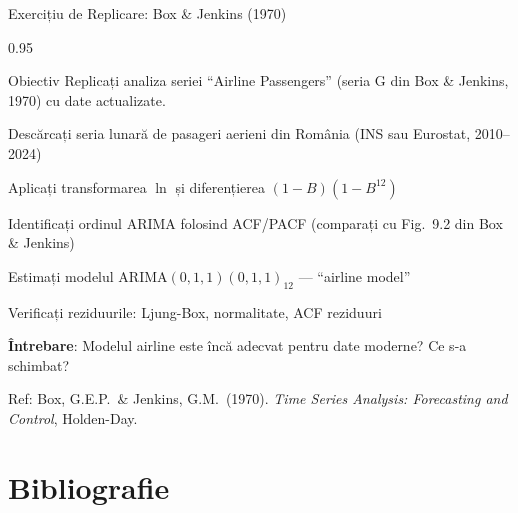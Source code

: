 \documentclass[9pt, aspectratio=169, t]{beamer}
\begin{document}
\begin{frame}{Exercițiu de Replicare: Box \& Jenkins (1970)}
    \begin{cminipage}{0.95\textwidth}
        \begin{block}{Obiectiv}
            Replicați analiza seriei ``Airline Passengers'' (seria G din Box \& Jenkins, 1970) cu date actualizate.
        \end{block}
        \begin{enumerate}\setlength{\itemsep}{2pt}
            {\small
            \item Descărcați seria lunară de pasageri aerieni din România (INS sau Eurostat, 2010--2024)
            \item Aplicați transformarea $\ln$ și diferențierea $(1-B)(1-B^{12})$
            \item Identificați ordinul ARIMA folosind ACF/PACF (comparați cu Fig.\ 9.2 din Box \& Jenkins)
            \item Estimați modelul ARIMA$(0,1,1)(0,1,1)_{12}$ --- ``airline model''
            \item Verificați reziduurile: Ljung-Box, normalitate, ACF reziduuri
            \item \textbf{Întrebare}: Modelul airline este încă adecvat pentru date moderne? Ce s-a schimbat?
            }
        \end{enumerate}
        {\tiny Ref: Box, G.E.P.\ \& Jenkins, G.M.\ (1970). \textit{Time Series Analysis: Forecasting and Control}, Holden-Day.}
    \end{cminipage}
\end{frame}
\section{Bibliografie}
\end{document}
